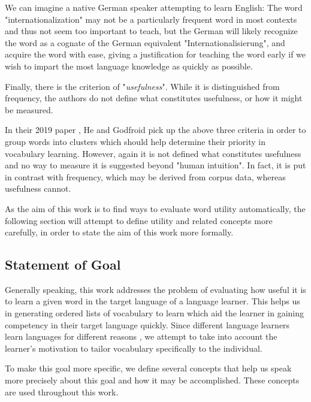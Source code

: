 We can imagine a native German speaker attempting to learn English:
The word "internationalization" may not be a particularly frequent word in most contexts and thus not seem too important to teach, but the German will likely recognize the word as a cognate of the German equivalent "Internationalisierung", and acquire the word with ease, giving a justification for teaching the word early if we wish to impart the most language knowledge as quickly as possible.

Finally, there is the criterion of "\textit{usefulness}".
While it is distinguished from frequency, the authors do not define what constitutes usefulness, or how it might be measured.

In their 2019 paper \cite{heChoosingWordsTeach2019}, He and Godfroid pick up the above three criteria in order to group words into clusters which should help determine their priority in vocabulary learning.
However, again it is not defined what constitutes usefulness and no way to measure it is suggested beyond "human intuition".
In fact, it is put in contrast with frequency, which may be derived from corpus data, whereas usefulness cannot.

As the aim of this work is to find ways to evaluate word utility automatically, the following section will attempt to define utility and related concepts more carefully, in order to state the aim of this work more formally.

\subsection{Statement of Goal} \label{sec:statement-of-goal}

Generally speaking, this work addresses the problem of evaluating how useful it is to learn a given word in the target language of a language learner.
This helps us in generating ordered lists of vocabulary to learn which aid the learner in gaining competency in their target language quickly.
Since different language learners learn languages for different reasons , we attempt to take into account the learner's motivation to tailor vocabulary specifically to the individual.

To make this goal more specific, we define several concepts that help us speak more precisely about this goal and how it may be accomplished.
These concepts are used throughout this work.

